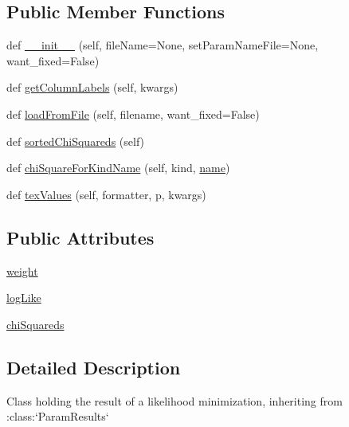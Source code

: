 \subsection*{Public Member Functions}
\begin{DoxyCompactItemize}
\item 
def \mbox{\hyperlink{classgetdist_1_1types_1_1BestFit_aa7ed592ec07bd8fe4d9a6de635a6364c}{\+\_\+\+\_\+init\+\_\+\+\_\+}} (self, file\+Name=None, set\+Param\+Name\+File=None, want\+\_\+fixed=False)
\item 
def \mbox{\hyperlink{classgetdist_1_1types_1_1BestFit_a56fe1c70a831f06b20dda685074ebdc6}{get\+Column\+Labels}} (self, kwargs)
\item 
def \mbox{\hyperlink{classgetdist_1_1types_1_1BestFit_a1f93055bc0ccff2dcf47aa1b671b1eac}{load\+From\+File}} (self, filename, want\+\_\+fixed=False)
\item 
def \mbox{\hyperlink{classgetdist_1_1types_1_1BestFit_a60ea86249e13c8869609065b5fc89228}{sorted\+Chi\+Squareds}} (self)
\item 
def \mbox{\hyperlink{classgetdist_1_1types_1_1BestFit_a54c4939e00eb6427284774a238fc61de}{chi\+Square\+For\+Kind\+Name}} (self, kind, \mbox{\hyperlink{classgetdist_1_1paramnames_1_1ParamList_aea1705e69ca01b937e118b44e468510a}{name}})
\item 
def \mbox{\hyperlink{classgetdist_1_1types_1_1BestFit_a1799944c35791bd7878e1776383f85c6}{tex\+Values}} (self, formatter, p, kwargs)
\end{DoxyCompactItemize}
\subsection*{Public Attributes}
\begin{DoxyCompactItemize}
\item 
\mbox{\hyperlink{classgetdist_1_1types_1_1BestFit_a55aeaf0af24610e27b143aa4f959e2ab}{weight}}
\item 
\mbox{\hyperlink{classgetdist_1_1types_1_1BestFit_a28cc70877c8a1616051400ddbec10e52}{log\+Like}}
\item 
\mbox{\hyperlink{classgetdist_1_1types_1_1BestFit_a516ce3fe6ffe560c6919a55a69bacf24}{chi\+Squareds}}
\end{DoxyCompactItemize}


\subsection{Detailed Description}
\begin{DoxyVerb}Class holding the result of a likelihood minimization, inheriting from :class:`ParamResults`
\end{DoxyVerb}
 

